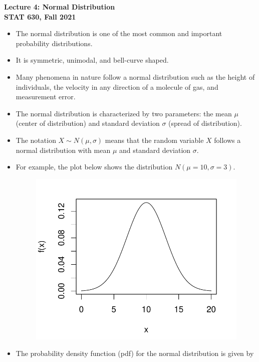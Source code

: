 \documentclass[fleqn, 11pt]{article}
\begin{document}
\setlength\parindent{0pt}

\begin{center}
\large
\textbf{Lecture 4: Normal Distribution}\\
\normalsize
\textbf{STAT 630, Fall 2021}\\
\hrulefill
\end{center}

\begin{itemize}
\item The normal distribution is one of the most common and important probability distributions. 
\item It is symmetric, unimodal, and bell-curve shaped.
\item Many phenomena in nature follow a normal distribution such as the height of individuals, the velocity in any direction of a molecule of gas, and measurement error.
\item The normal distribution is characterized by two parameters: the mean $\mu$ (center of distribution) and standard deviation $\sigma$ (spread of distribution).
\item The notation $X \sim N(\mu,\sigma)$ means that the random variable $X$ follows a normal distribution with mean $\mu$ and standard deviation $\sigma$. 
\item For example, the plot below shows the distribution $N(\mu=10, \sigma=3)$.
\begin{figure}[ht]
\includegraphics[scale=0.4]{figure/norm1.pdf}
\end{figure}
\item The probability density function (pdf) for the normal distribution is given by 

\end{itemize}
\end{document}
